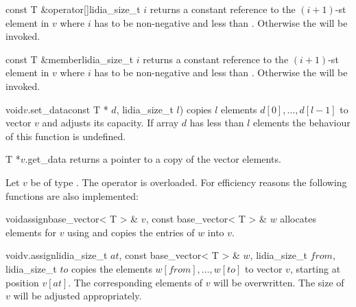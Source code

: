 \begin{cfcode}{const T &}{operator[]}{lidia_size_t $i$}
  returns a constant reference to the $(i+1)$-st element in $v$ where $i$ has to be non-negative
  and less than .  Otherwise the \LEH will be invoked.
\end{cfcode}

\begin{cfcode}{const T &}{member}{lidia_size_t $i$}
  returns a constant reference to the $(i+1)$-st element in $v$ where $i$ has to be non-negative
  and less than .  Otherwise the \LEH will be invoked.
\end{cfcode}




\begin{fcode}{void}{$v$.set_data}{const T * $d$, lidia_size_t $l$)}
  copies $l$ elements $d[0], \dots, d[l-1]$ to vector $v$ and adjusts its capacity.  If array $d$
  has less than $l$ elements the behaviour of this function is undefined.
\end{fcode}

\begin{cfcode}{T *}{$v$.get_data}{}
  returns a pointer to a copy of the vector elements.
\end{cfcode}



\ASGN

Let $v$ be of type .  The operator \code{=} is overloaded.  For efficiency
reasons the following functions are also implemented:

\begin{fcode}{void}{assign}{base_vector< T > & $v$, const base_vector< T > & $w$}
  allocates  elements for $v$ using  and copies the entries of
  $w$ into $v$.
\end{fcode}

\begin{fcode}{void}{v.assign}{lidia_size_t $\mathit{at}$, const base_vector< T > & $w$,
    lidia_size_t $\mathit{from}$, lidia_size_t $\mathit{to}$}%
  copies the elements $w[\mathit{from}], \dots, w[\mathit{to}]$ to vector $v$, starting at
  position $v[\mathit{at}]$.  The corresponding elements of $v$ will be overwritten.  The size
  of $v$ will be adjusted appropriately.
\end{fcode}


